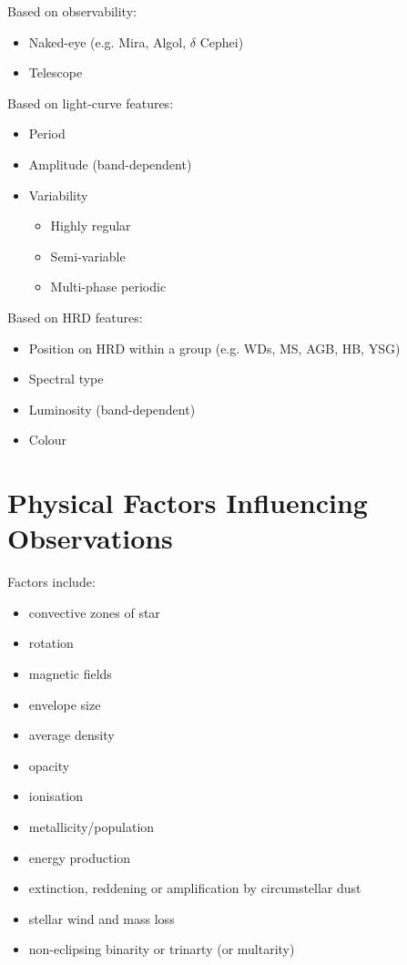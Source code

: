 \documentclass{spy}
\begin{document}
Based on observability:
\begin{itemize}
\item Naked-eye (e.g. Mira, Algol, \(\delta\) Cephei)
\item Telescope
\end{itemize}

Based on light-curve features:
\begin{itemize}
\item Period
\item Amplitude (band-dependent)
\item Variability
    \begin{itemize}
    \item Highly regular
    \item Semi-variable
    \item Multi-phase periodic
\end{itemize}\end{itemize}

Based on HRD features:
\begin{itemize}
\item Position on HRD within a group (e.g. WDs, MS, AGB, HB, YSG)
\item Spectral type
\item Luminosity (band-dependent)
\item Colour
\end{itemize}


\section{Physical Factors Influencing Observations}
Factors include:
\begin{itemize}
\item convective zones of star
\item rotation
\item magnetic fields
\item envelope size
\item average density
\item opacity
\item ionisation
\item metallicity/population
\item energy production
\item extinction, reddening or amplification by circumstellar dust
\item stellar wind and mass loss
\item non-eclipsing binarity or trinarty (or multarity)
\end{itemize}
\end{document}
